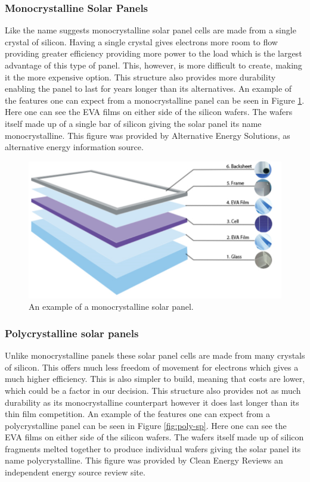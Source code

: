 \subsubsection{Monocrystalline Solar Panels}

Like the name suggests monocrystalline solar panel cells are made from a single crystal of silicon. Having a single crystal gives electrons more room to flow providing greater efficiency providing more power to the load which is the largest advantage of this type of panel. This, however, is more difficult to create, making it the more expensive option. This structure also provides more durability enabling the panel to last for years longer than its alternatives. An example of the features one can expect from a monocrystalline panel can be seen in Figure \ref{fig:mono-sp}. Here one can see the EVA films on either side of the silicon wafers. The wafers itself made up of a single bar of silicon giving the solar panel its name monocrystalline. This figure was provided by Alternative Energy Solutions, as alternative energy information source.

\begin{figure}
    \centering
    \includegraphics[scale=0.5]{figures/monocrystaline.png}
    \caption{An example of a monocrystalline solar panel.}
    \label{fig:mono-sp} 
\end{figure}
\subsubsection{Polycrystalline solar panels}

Unlike monocrystalline panels these solar panel cells are made from many crystals of silicon. This offers much less freedom of movement for electrons which gives a much higher efficiency. This is also simpler to build, meaning that costs are lower, which could be a factor in our decision. This structure also provides not as much durability as its monocrystalline counterpart however it does last longer than its thin film competition. An example of the features one can expect from a polycrystalline panel can be seen in Figure \ref{fig:poly-sp}. Here one can see the EVA films on either side of the silicon wafers. The wafers itself made up of silicon fragments melted together to produce individual wafers giving the solar panel its name polycrystalline. This figure was provided by Clean Energy Reviews an independent energy source review site.

